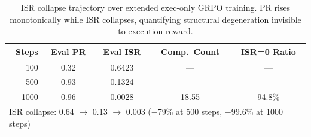 \begin{table}[t]
\centering
\caption{ISR collapse trajectory over extended exec-only GRPO training. PR rises monotonically while ISR collapses, quantifying structural degeneration invisible to execution reward.}
\label{tab:isr-collapse}
\begin{tabular}{rcccc}
\toprule
\textbf{Steps} & \textbf{Eval PR} & \textbf{Eval ISR} & \textbf{Comp.\ Count} & \textbf{ISR{=}0 Ratio} \\
\midrule
100 & 0.32 & 0.6423 & --- & --- \\
500 & 0.93 & 0.1324 & --- & --- \\
1000 & 0.96 & 0.0028 & 18.55 & 94.8\% \\
\midrule
\multicolumn{5}{l}{\footnotesize ISR collapse: 0.64 $\rightarrow$ 0.13 $\rightarrow$ 0.003 ($-$79\% at 500 steps, $-$99.6\% at 1000 steps)} \\
\bottomrule
\end{tabular}
\end{table}
